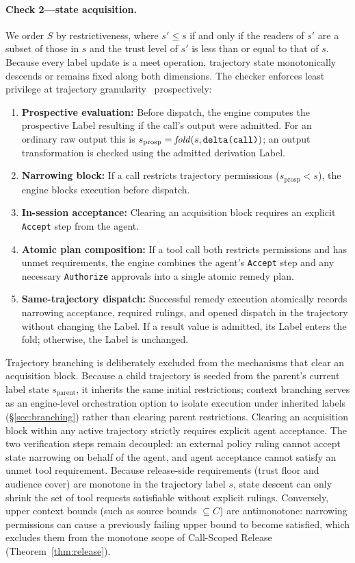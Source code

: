 \paragraph{Check 2---state acquisition.}
We order $S$ by restrictiveness, where $s' \le s$ if and only if the readers of $s'$ are a subset of those in $s$ and the trust level of $s'$ is less than or equal to that of $s$. Because every label update is a meet operation, trajectory state monotonically descends or remains fixed along both dimensions. The checker enforces least privilege at trajectory granularity~\cite{saltzer1975protection} prospectively:
\begin{enumerate}
  \item \textbf{Prospective evaluation:} Before dispatch, the engine computes the prospective Label resulting if the call's output were admitted. For an ordinary raw output this is $s_{\mathrm{prosp}} = \mathit{fold}(s, \texttt{delta(call)})$; an output transformation is checked using the admitted derivation Label.
  \item \textbf{Narrowing block:} If a call restricts trajectory permissions ($s_{\mathrm{prosp}} < s$), the engine blocks execution before dispatch.
  \item \textbf{In-session acceptance:} Clearing an acquisition block requires an explicit \texttt{Accept} step from the agent.
  \item \textbf{Atomic plan composition:} If a tool call both restricts permissions and has unmet requirements, the engine combines the agent's \texttt{Accept} step and any necessary \texttt{Authorize} approvals into a single atomic remedy plan.
  \item \textbf{Same-trajectory dispatch:} Successful remedy execution atomically records narrowing acceptance, required rulings, and opened dispatch in the trajectory without changing the Label. If a result value is admitted, its Label enters the fold; otherwise, the Label is unchanged.
\end{enumerate}

Trajectory branching is deliberately excluded from the mechanisms that clear an acquisition block. Because a child trajectory is seeded from the parent's current label state $s_{\mathrm{parent}}$, it inherits the same initial restrictions; context branching serves as an engine-level orchestration option to isolate execution under inherited labels (\S\ref{sec:branching}) rather than clearing parent restrictions. Clearing an acquisition block within any active trajectory strictly requires explicit agent acceptance. The two verification steps remain decoupled: an external policy ruling cannot accept state narrowing on behalf of the agent, and agent acceptance cannot satisfy an unmet tool requirement.
Because release-side requirements (trust floor and audience cover) are monotone in the trajectory label $s$, state descent can only shrink the set of tool requests satisfiable without explicit rulings. Conversely, upper context bounds (such as source bounds $\subseteq C$) are antimonotone: narrowing permissions can cause a previously failing upper bound to become satisfied, which excludes them from the monotone scope of Call-Scoped Release (Theorem~\ref{thm:release}).

